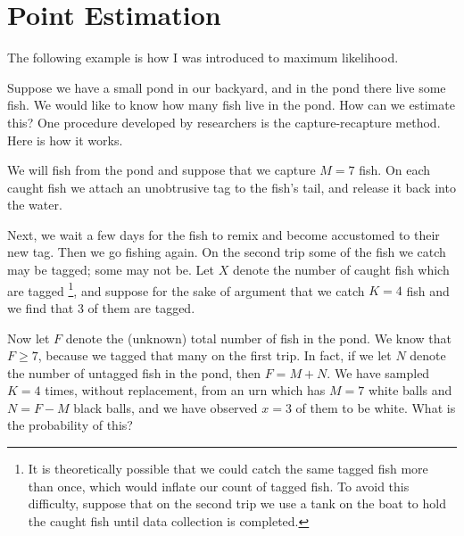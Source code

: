 \documentclass[captions=tableheading]{scrbook}
\begin{document}
\section{Point Estimation}
\label{sec-9-1}

\label{sec:Point-Estimation-1}

The following example is how I was introduced to maximum likelihood.

\begin{example}
\label{exa:how-many-fish}
Suppose we have a small pond in our backyard, and in the pond there live some fish. We would like to know how many fish live in the pond. How can we estimate this? One procedure developed by researchers is the capture-recapture method. Here is how it works.

We will fish from the pond and suppose that we capture \(M=7\) fish. On each caught fish we attach an unobtrusive tag to the fish's tail, and release it back into the water. 

Next, we wait a few days for the fish to remix and become accustomed to their new tag. Then we go fishing again. On the second trip some of the fish we catch may be tagged; some may not be. Let \(X\) denote the number of caught fish which are tagged
\footnote{It is theoretically possible that we could catch the same tagged fish more than once, which would inflate our count of tagged fish. To avoid this difficulty, suppose that on the second trip we use a tank on the boat to hold the caught fish until data collection is completed.},
and suppose for the sake of argument that we catch \(K=4\) fish and we find that 3 of them are tagged.

Now let \(F\) denote the (unknown) total number of fish in the pond. We know that \(F\geq7\), because we tagged that many on the first trip. In fact, if we let \(N\) denote the number of untagged fish in the pond, then \(F=M+N\). We have sampled \(K=4\) times, without replacement, from an urn which has \(M=7\) white balls and \(N=F-M\) black balls, and we have observed \(x=3\) of them to be white. What is the probability of this?


\end{example}
\end{document}
